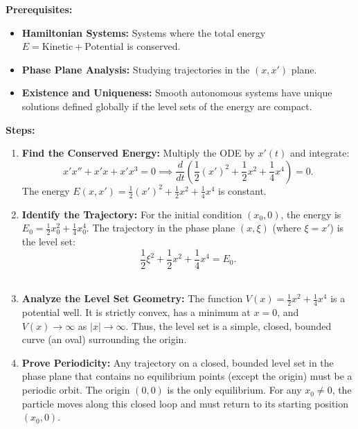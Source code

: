 \begin{solution}
\textbf{Prerequisites:} 
\begin{itemize}
    \item \textbf{Hamiltonian Systems:} Systems where the total energy $E = \text{Kinetic} + \text{Potential}$ is conserved.
    \item \textbf{Phase Plane Analysis:} Studying trajectories in the $(x, x')$ plane.
    \item \textbf{Existence and Uniqueness:} Smooth autonomous systems have unique solutions defined globally if the level sets of the energy are compact.
\end{itemize}

\bigskip

\textbf{Steps:}
\begin{enumerate}
    \item \textbf{Find the Conserved Energy:} Multiply the ODE by $x'(t)$ and integrate:
    \[ x'x'' + x'x + x'x^3 = 0 \implies \frac{d}{dt} \left( \frac{1}{2}(x')^2 + \frac{1}{2}x^2 + \frac{1}{4}x^4 \right) = 0. \]
    The energy $E(x, x') = \frac{1}{2}(x')^2 + \frac{1}{2}x^2 + \frac{1}{4}x^4$ is constant. \\[2ex]

    \item \textbf{Identify the Trajectory:} For the initial condition $(x_0, 0)$, the energy is $E_0 = \frac{1}{2}x_0^2 + \frac{1}{4}x_0^4$. The trajectory in the phase plane $(x, \xi)$ (where $\xi = x'$) is the level set:
    \[ \frac{1}{2}\xi^2 + \frac{1}{2}x^2 + \frac{1}{4}x^4 = E_0. \] \\[2ex]

    \item \textbf{Analyze the Level Set Geometry:} The function $V(x) = \frac{1}{2}x^2 + \frac{1}{4}x^4$ is a potential well. It is strictly convex, has a minimum at $x=0$, and $V(x) \to \infty$ as $|x| \to \infty$. Thus, the level set is a simple, closed, bounded curve (an oval) surrounding the origin. \\[2ex]

    \item \textbf{Prove Periodicity:} Any trajectory on a closed, bounded level set in the phase plane that contains no equilibrium points (except the origin) must be a periodic orbit. The origin $(0,0)$ is the only equilibrium. For any $x_0 \neq 0$, the particle moves along this closed loop and must return to its starting position $(x_0, 0)$. \\[2ex]


\end{enumerate}
\end{solution}
